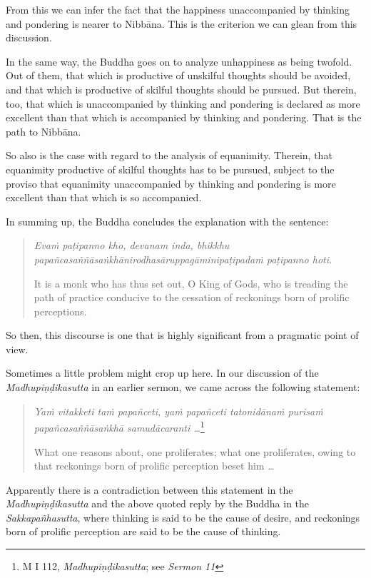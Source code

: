 From this we can infer the fact that the happiness unaccompanied by thinking and pondering is nearer to Nibbāna. This is the criterion we can glean from this discussion.

In the same way, the Buddha goes on to analyze unhappiness as being twofold. Out of them, that which is productive of unskilful thoughts should be avoided, and that which is productive of skilful thoughts should be pursued. But therein, too, that which is unaccompanied by thinking and pondering is declared as more excellent than that which is accompanied by thinking and pondering. That is the path to Nibbāna.

So also is the case with regard to the analysis of equanimity. Therein, that equanimity productive of skilful thoughts has to be pursued, subject to the proviso that equanimity unaccompanied by thinking and pondering is more excellent than that which is so accompanied.

In summing up, the Buddha concludes the explanation with the sentence:

\begin{quote}
\emph{Evaṁ paṭipanno kho, devanam inda, bhikkhu papañcasaññāsaṅkhānirodhasāruppagāminipaṭipadaṁ paṭipanno hoti.}

It is a monk who has thus set out, O King of Gods, who is treading the path of practice conducive to the cessation of reckonings born of prolific perceptions.
\end{quote}

So then, this discourse is one that is highly significant from a pragmatic point of view.

Sometimes a little problem might crop up here. In our discussion of the \emph{Madhupiṇḍikasutta} in an earlier sermon, we came across the following statement:

\begin{quote}
\emph{Yaṁ vitakketi taṁ papañceti, yaṁ papañceti tatonidānaṁ purisaṁ papañcasaññāsaṅkhā samudācaranti \ldots{}}\footnote{M I 112, \emph{Madhupiṇḍikasutta}; see \emph{Sermon 11}}

What one reasons about, one proliferates; what one proliferates, owing to that reckonings born of prolific perception beset him \ldots{}
\end{quote}

Apparently there is a contradiction between this statement in the \emph{Madhupiṇḍikasutta} and the above quoted reply by the Buddha in the \emph{Sakkapañhasutta}, where thinking is said to be the cause of desire, and reckonings born of prolific perception are said to be the cause of thinking.


